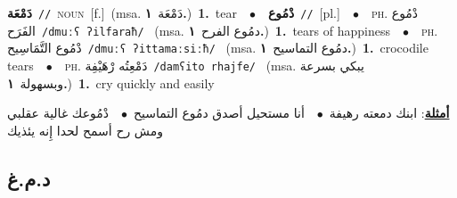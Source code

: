 \documentclass[10pt,a4paper,twoside]{article} %
\begin{document}
\begin{multicols}{2}
{\setlength\topsep{0pt}\textbf{\foreignlanguage{arabic}{دَمْعَة}}\ {\color{gray}\texttt{//}\color{black}}\ \textsc{noun}\ [f.]\ \color{gray}(msa. \foreignlanguage{arabic}{دَمْعَة}~\foreignlanguage{arabic}{\textbf{١.}})\color{black}\ \textbf{1.}~tear\ \ $\bullet$\ \ \setlength\topsep{0pt}\textbf{\foreignlanguage{arabic}{دْمُوع}}\ {\color{gray}\texttt{//}\color{black}}\ [pl.]\ \ $\bullet$\ \ \textsc{ph.} \color{gray} \foreignlanguage{arabic}{دْمُوع الفَرَح}\color{black}\ {\color{gray}\texttt{/{\sffamily dmuːʕ ʔilfaraħ}/}\color{black}}\ \color{gray} (msa. \foreignlanguage{arabic}{دمُوع الفرح}~\foreignlanguage{arabic}{\textbf{١.}})\color{black}\ \textbf{1.}~tears of happiness\ \ $\bullet$\ \ \textsc{ph.} \color{gray} \foreignlanguage{arabic}{دْمُوع التَّمَاسِيح}\color{black}\ {\color{gray}\texttt{/{\sffamily dmuːʕ ʔittamaːsiːħ}/}\color{black}}\ \color{gray} (msa. \foreignlanguage{arabic}{دمُوع التماسيح}~\foreignlanguage{arabic}{\textbf{١.}})\color{black}\ \textbf{1.}~crocodile tears\ \ $\bullet$\ \ \textsc{ph.} \color{gray} \foreignlanguage{arabic}{دَمْعِتُه رْهَيْفِة}\color{black}\ {\color{gray}\texttt{/{\sffamily damʕito rhajfe}/}\color{black}}\ \color{gray} (msa. \foreignlanguage{arabic}{يبكي بسرعة وبسهولة}~\foreignlanguage{arabic}{\textbf{١.}})\color{black}\ \textbf{1.}~cry quickly and easily\  \begin{flushright}\color{gray}\foreignlanguage{arabic}{\textbf{\underline{\foreignlanguage{arabic}{أمثلة}}}: ابنك دمعته رهيفة\ $\bullet$\ \  أنا مستحيل أصدق دمُوع التماسيح\ $\bullet$\ \  دْمُوعك غالية عقلبي ومش رح أسمح لحدا إِنه يئذيك}\end{flushright}\color{black}} \vspace{2mm}

\vspace{-3mm}
\subsection*{\color{blue}\foreignlanguage{arabic}{د.م.غ}\color{blue}{}} 


\end{multicols}
\end{document}
